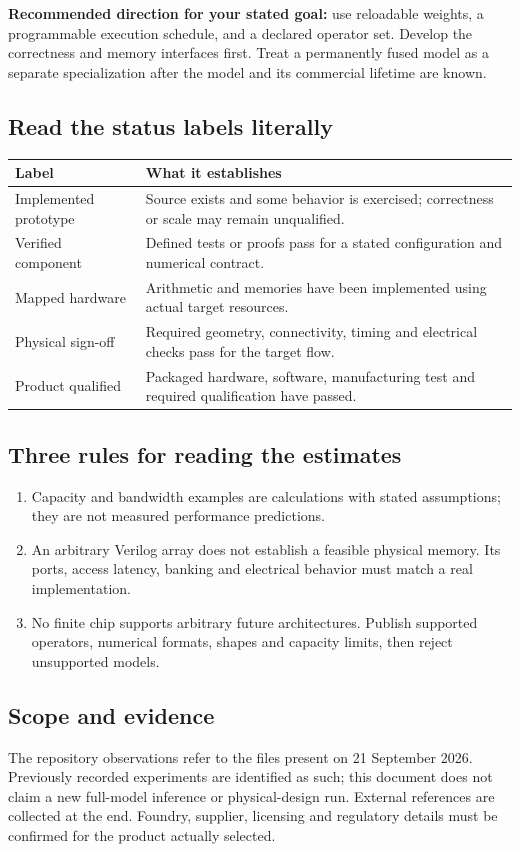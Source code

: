 \documentclass[11pt,a4paper]{article}
\newcommand{\note}[1]{\begin{tcolorbox}[colback=pale,colframe=teal,boxrule=0.6pt,arc=1mm,left=8pt,right=8pt,top=6pt,bottom=6pt]#1\end{tcolorbox}}
\begin{document}
\note{\textbf{Recommended direction for your stated goal:} use reloadable weights,
a programmable execution schedule, and a declared operator set. Develop the
correctness and memory interfaces first. Treat a permanently fused model as a
separate specialization after the model and its commercial lifetime are known.}

\subsection*{Read the status labels literally}
\begin{tabularx}{\linewidth}{@{}p{31mm}Y@{}}
\toprule
\textbf{Label} & \textbf{What it establishes}\\\midrule
Implemented prototype & Source exists and some behavior is exercised; correctness or scale may remain unqualified.\\
Verified component & Defined tests or proofs pass for a stated configuration and numerical contract.\\
Mapped hardware & Arithmetic and memories have been implemented using actual target resources.\\
Physical sign-off & Required geometry, connectivity, timing and electrical checks pass for the target flow.\\
Product qualified & Packaged hardware, software, manufacturing test and required qualification have passed.\\\bottomrule
\end{tabularx}

\subsection*{Three rules for reading the estimates}
\begin{enumerate}
\item Capacity and bandwidth examples are calculations with stated assumptions;
they are not measured performance predictions.
\item An arbitrary Verilog array does not establish a feasible physical memory.
Its ports, access latency, banking and electrical behavior must match a real implementation.
\item No finite chip supports arbitrary future architectures. Publish supported
operators, numerical formats, shapes and capacity limits, then reject unsupported models.
\end{enumerate}

\subsection*{Scope and evidence}
The repository observations refer to the files present on 21 September 2026.
Previously recorded experiments are identified as such; this document does not
claim a new full-model inference or physical-design run. External references are
collected at the end. Foundry, supplier, licensing and regulatory details must be
confirmed for the product actually selected.
\end{document}
